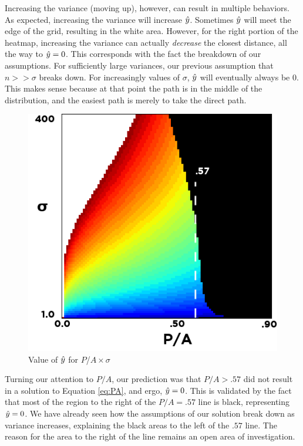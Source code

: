 Increasing the variance (moving up), however, can result in multiple behaviors. As expected, increasing the variance will increase $\hat{y}$. Sometimes $\hat{y}$ will meet the edge of the grid, resulting in the white area. However, for the right portion of the heatmap, increasing the variance can actually \emph{decrease} the closest distance, all the way to $\hat{y}=0$. This corresponds with the fact the breakdown of our assumptions. For sufficiently large variances, our previous assumption that $n>>\sigma$ breaks down. For increasingly values of $\sigma$, $\hat{y}$ will eventually always be $0$. This makes sense because at that point the path is in the middle of the distribution, and the easiest path is merely to take the direct path. 

\begin{figure}
\centering
\includegraphics[width=.86\columnwidth]{graphix/heatmap.png}
\caption{Value of $\hat{y}$ for $P$/$A \times \sigma$}
\label{fig:heatmap}
\end{figure}

Turning our attention to $P/A$, our prediction was that $P/A > .57$ did not result in a solution to Equation \ref{eq:PA}, and ergo, $\hat{y}=0$. This is validated by the fact that most of the region to the right of the $P/A = .57$ line is black, representing $\hat{y}=0$. We have already seen how the assumptions of our solution break down as variance increases, explaining the black areas to the left of the $.57$ line. The reason for the area to the right of the line remains an open area of investigation. 

